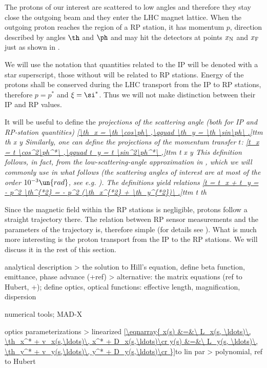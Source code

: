 The protons of our interest are scattered to low angles and therefore they stay close the outgoing beam and they enter the LHC magnet lattice. When the outgoing proton reaches the region of a RP station, it has momentum $p$, direction described by angles $\th$ and $\ph$ and may hit the detectors at points $x_{\rm N}$ and $x_{\rm F}$ just as shown in .

We will use the notation that quantities related to the IP will be denoted with a star superscript, those without will be related to RP stations. Energy of the protons shall be conserved during the LHC transport from the IP to RP stations, therefore $p = p^*$ and $\xi = \si^*$. Thus we will not make distinction between their IP and RP values.

It will be useful to define the \em{projections of the scattering angle} (both for IP and RP-station quantities)
\eqref{\th_x = \th \cos\ph\ ,\qquad \th_y = \th \sin\ph\ .}{ttm th x y}
Similarly, one can define the projections of the momentum transfer $t$:
\eqref{t_x = t \cos^2\ph^*\ ,\qquad t_y = t \sin^2\ph^*\ ,}{ttm t x y}
This definition follows, in fact, from the low-scattering-angle approximation in , which we will commonly use in what follows (the scattering angles of interest are at most of the order $10^{-3}\un{rad}$, see e.g. ). The definitions  yield relations
\eqref{t = t_x + t_y = - p^2 \th^{*2} = - p^2 (\th_x^{*2} + \th_y^{*2})\ .}{ttm t th}

Since the magnetic field within the RP stations is negligible, protons follow a straight trajectory there. The relation between RP sensor measurements and the parameters of the trajectory is, therefore simple (for details see ). What is much more interesting is the proton transport from the IP to the RP stations. We will discuss it in the rest of this section.

\> analytical description
\>> the solution to Hill's equation, define beta function, emittance, phase advance (+ref)
\>> alternative: the matrix equations (ref to Hubert, +); define optics, optical functions: effective length, magnification, dispersion

\> numerical tools; MAD-X

\> optics parameterizations
\>> linearized
\eqref{\eqnarray{
x(s) &=&\ L_x(s, \ldots)\, \th_x^* + v_x(s,\ldots)\, x^* + D_x(s,\ldots)\cr
y(s) &=&\ L_y(s, \ldots)\, \th_y^* + v_y(s,\ldots)\, y^* + D_y(s,\ldots)\cr
}}{to lin par}
\>> polynomial, ref to Hubert

